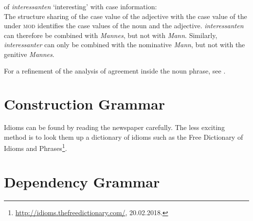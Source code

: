 \begin{enumerate}
\eas
\catv of \emph{interessanten} `interesting' with case information:\\
\zs
The structure sharing of the case value of the adjective with the case value of the \nbar under \textsc{mod}
identifies the case values of the noun and the adjective. \emph{interessanten} can therefore be combined with 
\emph{Mannes}, but not with \emph{Mann}. Similarly, \emph{interessanter}
can only be combined with the nominative \emph{Mann}, but not with the genitive \emph{Mannes}. 

For a refinement of the analysis of agreement inside the noun phrase, see .
\end{enumerate}


\section{Construction Grammar}

Idioms can be found by reading the newspaper carefully. The less exciting method is to look them up a dictionary of
idioms such as the Free Dictionary of Idioms and Phrases\footnote{
\url{http://idioms.thefreedictionary.com/}, 20.02.2018.
}.


\section{Dependency Grammar}

\begin{figure}[H]
\centering
{}
\end{figure}%

\begin{figure}[H]
\centering
{}
\end{figure}%

